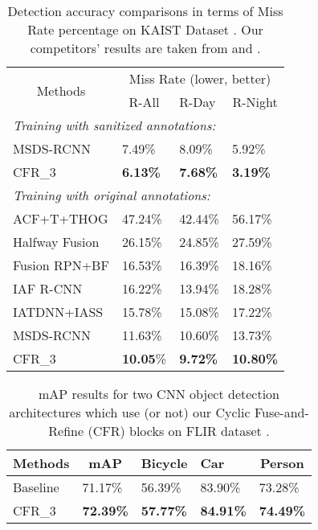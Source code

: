 \documentclass{article}
\begin{document}
\begin{table}[h!]
\centering
\begin{tabular}{llll}
\hline
\multicolumn{1}{c}{\multirow{2}{*}{Methods}} & \multicolumn{3}{c}{Miss Rate (lower, better)}\\ \cline{2-4}
\multicolumn{1}{c}{} & \multicolumn{1}{c}{R-All} & R-Day & \multicolumn{1}{c}{R-Night} \\ \hline
\multicolumn{4}{l}{\textit{Training with sanitized annotations:}}  \\
MSDS-RCNN \cite{MSDS} & 7.49\% & 8.09\% & 5.92\% \\
CFR\_3 & \textbf{6.13\%} & \textbf{7.68\%} & \textbf{3.19\%} \\ \hline
\multicolumn{4}{l}{\textit{Training with original annotations:}} \\
ACF+T+THOG \cite{KAIST} & 47.24\% & 42.44\% & 56.17\% \\
Halfway Fusion \cite{TestAnno} & 26.15\% & 24.85\% & 27.59\% \\
Fusion RPN+BF \cite{RPNM} & 16.53\% & 16.39\% & 18.16\% \\
IAF R-CNN \cite{Illumination-aware-li} & 16.22\% & 13.94\% & 18.28\% \\
IATDNN+IASS \cite{Illumination-aware-guan} & 15.78\% & 15.08\% & 17.22\% \\
MSDS-RCNN \cite{MSDS} & 11.63\% & 10.60\% & 13.73\% \\
CFR\_3 & \textbf{10.05}\% & \textbf{9.72\%} & \textbf{10.80\%} \\ \hline
\end{tabular}
\caption{
Detection accuracy comparisons in terms of Miss Rate percentage on KAIST Dataset \cite{KAIST}. Our competitors' results are taken from \cite{Illumination-aware-li} and \cite{MSDS}.
}
\label{tab:sota}
\end{table}

\begin{table}[h!]
\centering
\begin{tabular}{lllll}
\hline
\multicolumn{1}{c}{Methods} & \multicolumn{1}{c}{mAP} & \multicolumn{1}{c}{Bicycle} & Car & \multicolumn{1}{c}{Person} \\ \hline
Baseline & 71.17\% & 56.39\% & 83.90\% & 73.28\% \\
CFR\_3 & \textbf{72.39\%} & \textbf{57.77\%} & \textbf{84.91\%} & \textbf{74.49\%} \\ \hline
\end{tabular}
\caption{
mAP results for two CNN object detection architectures which use (or not) our Cyclic Fuse-and-Refine (CFR) blocks on FLIR dataset \cite{Flir}.
}
\label{tab:flir}
\end{table}
\end{document}
